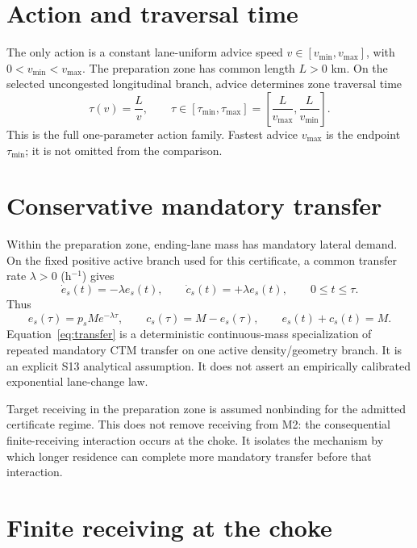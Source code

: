 \documentclass[11pt]{article}
\begin{document}
\section{Action and traversal time}

The only action is a constant lane-uniform advice speed
\(v\in[v_{\min},v_{\max}]\), with \(0<v_{\min}<v_{\max}\). The preparation
zone has common length \(L>0\) km. On the selected uncongested longitudinal
branch, advice determines zone traversal time
\begin{equation}
 \tau(v)=\frac{L}{v},\qquad
 \tau\in[\tau_{\min},\tau_{\max}]
 =\left[\frac{L}{v_{\max}},\frac{L}{v_{\min}}\right].
 \label{eq:tau}
\end{equation}
This is the full one-parameter action family. Fastest advice \(v_{\max}\) is
the endpoint \(\tau_{\min}\); it is not omitted from the comparison.

\section{Conservative mandatory transfer}

Within the preparation zone, ending-lane mass has mandatory lateral demand. On
the fixed positive active branch used for this certificate, a common transfer
rate \(\lambda>0\) (h\(^{-1}\)) gives
\begin{equation}
 \dot e_s(t)=-\lambda e_s(t),\qquad
 \dot c_s(t)=+\lambda e_s(t),\qquad 0\le t\le\tau.
 \label{eq:transfer}
\end{equation}
Thus
\begin{equation}
 e_s(\tau)=p_sM e^{-\lambda\tau},\qquad
 c_s(\tau)=M-e_s(\tau),\qquad e_s(t)+c_s(t)=M.
 \label{eq:remaining}
\end{equation}
Equation~\eqref{eq:transfer} is a deterministic continuous-mass specialization
of repeated mandatory CTM transfer on one active density/geometry branch. It is
an explicit S13 analytical assumption. It does not assert an empirically
calibrated exponential lane-change law.

Target receiving in the preparation zone is assumed nonbinding for the admitted
certificate regime. This does not remove receiving from M2: the consequential
finite-receiving interaction occurs at the choke. It isolates the mechanism by
which longer residence can complete more mandatory transfer before that
interaction.

\section{Finite receiving at the choke}
\end{document}
